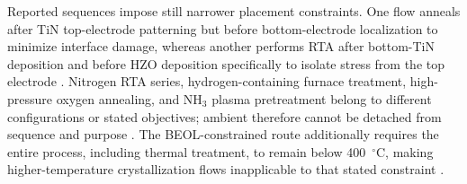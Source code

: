 \documentclass[11pt,a4paper]{report}
\begin{document}
Reported sequences impose still narrower placement constraints. One flow anneals after TiN top-electrode patterning but before bottom-electrode localization to minimize interface damage, whereas another performs RTA after bottom-TiN deposition and before HZO deposition specifically to isolate stress from the top electrode \cite{kaatranen2026unif,kim2020tin}. Nitrogen RTA series, hydrogen-containing furnace treatment, high-pressure oxygen annealing, and NH$_3$ plasma pretreatment belong to different configurations or stated objectives; ambient therefore cannot be detached from sequence and purpose \cite{park2022chamber,kim2020tin,liao2023postmoore}. The BEOL-constrained route additionally requires the entire process, including thermal treatment, to remain below 400~$^\circ$C, making higher-temperature crystallization flows inapplicable to that stated constraint \cite{schroeder2023road,neuber2022peald}.
\end{document}
